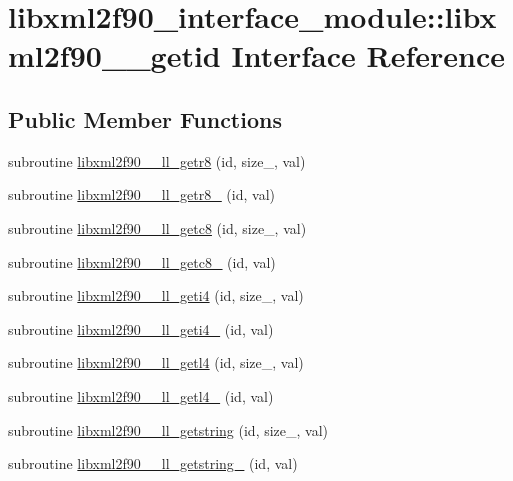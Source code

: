 \hypertarget{interfacelibxml2f90__interface__module_1_1libxml2f90____getid}{}\section{libxml2f90\+\_\+interface\+\_\+module\+:\+:libxml2f90\+\_\+\+\_\+getid Interface Reference}
\label{interfacelibxml2f90__interface__module_1_1libxml2f90____getid}
\subsection*{Public Member Functions}
\begin{DoxyCompactItemize}
\item 
subroutine \hyperlink{interfacelibxml2f90__interface__module_1_1libxml2f90____getid_a90184cbc2223f83811ff517939872f6c}{libxml2f90\+\_\+\+\_\+ll\+\_\+getr8} (id, size\+\_\+, val)
\item 
subroutine \hyperlink{interfacelibxml2f90__interface__module_1_1libxml2f90____getid_ab2ba4178858481e2205e5e3ae25ffff5}{libxml2f90\+\_\+\+\_\+ll\+\_\+getr8\+\_\+} (id, val)
\item 
subroutine \hyperlink{interfacelibxml2f90__interface__module_1_1libxml2f90____getid_a17544d6ab6b7ad80326168cd5c491188}{libxml2f90\+\_\+\+\_\+ll\+\_\+getc8} (id, size\+\_\+, val)
\item 
subroutine \hyperlink{interfacelibxml2f90__interface__module_1_1libxml2f90____getid_a77c23dfe5d971b6c13266a7911e19a58}{libxml2f90\+\_\+\+\_\+ll\+\_\+getc8\+\_\+} (id, val)
\item 
subroutine \hyperlink{interfacelibxml2f90__interface__module_1_1libxml2f90____getid_ac27030a8c987e2a8b2ecbd17d196048e}{libxml2f90\+\_\+\+\_\+ll\+\_\+geti4} (id, size\+\_\+, val)
\item 
subroutine \hyperlink{interfacelibxml2f90__interface__module_1_1libxml2f90____getid_a4e3e55b3dc72d0b237e9c6800f3fc146}{libxml2f90\+\_\+\+\_\+ll\+\_\+geti4\+\_\+} (id, val)
\item 
subroutine \hyperlink{interfacelibxml2f90__interface__module_1_1libxml2f90____getid_ac8ee9f5b40986b39fdcbdd3704d38f36}{libxml2f90\+\_\+\+\_\+ll\+\_\+getl4} (id, size\+\_\+, val)
\item 
subroutine \hyperlink{interfacelibxml2f90__interface__module_1_1libxml2f90____getid_a3ff3898453a4c3d066cde17b28c3782e}{libxml2f90\+\_\+\+\_\+ll\+\_\+getl4\+\_\+} (id, val)
\item 
subroutine \hyperlink{interfacelibxml2f90__interface__module_1_1libxml2f90____getid_adb9b74ac9863918c373410e0def71d25}{libxml2f90\+\_\+\+\_\+ll\+\_\+getstring} (id, size\+\_\+, val)
\item 
subroutine \hyperlink{interfacelibxml2f90__interface__module_1_1libxml2f90____getid_ab52962d986e6297e30e2df5d6bce0817}{libxml2f90\+\_\+\+\_\+ll\+\_\+getstring\+\_\+} (id, val)
\end{DoxyCompactItemize}


